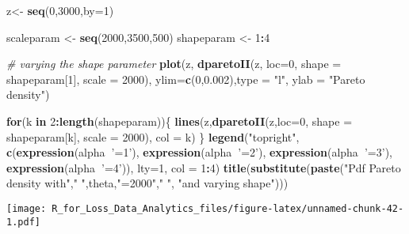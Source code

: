 \documentclass[]{book}
\newenvironment{Shaded}{\begin{snugshade}}{\end{snugshade}}
\newcommand{\KeywordTok}[1]{\textcolor[rgb]{0.13,0.29,0.53}{\textbf{#1}}}
\newcommand{\DataTypeTok}[1]{\textcolor[rgb]{0.13,0.29,0.53}{#1}}
\newcommand{\DecValTok}[1]{\textcolor[rgb]{0.00,0.00,0.81}{#1}}
\newcommand{\FloatTok}[1]{\textcolor[rgb]{0.00,0.00,0.81}{#1}}
\newcommand{\StringTok}[1]{\textcolor[rgb]{0.31,0.60,0.02}{#1}}
\newcommand{\CommentTok}[1]{\textcolor[rgb]{0.56,0.35,0.01}{\textit{#1}}}
\newcommand{\ControlFlowTok}[1]{\textcolor[rgb]{0.13,0.29,0.53}{\textbf{#1}}}
\newcommand{\OperatorTok}[1]{\textcolor[rgb]{0.81,0.36,0.00}{\textbf{#1}}}
\newcommand{\NormalTok}[1]{#1}
\theoremstyle{definition}
\theoremstyle{definition}
\theoremstyle{definition}
\theoremstyle{remark}
\begin{document}
\begin{Shaded}
\begin{Highlighting}[]
\NormalTok{z<-}\StringTok{ }\KeywordTok{seq}\NormalTok{(}\DecValTok{0}\NormalTok{,}\DecValTok{3000}\NormalTok{,}\DataTypeTok{by=}\DecValTok{1}\NormalTok{)}

\NormalTok{scaleparam <-}\StringTok{ }\KeywordTok{seq}\NormalTok{(}\DecValTok{2000}\NormalTok{,}\DecValTok{3500}\NormalTok{,}\DecValTok{500}\NormalTok{)}
\NormalTok{shapeparam <-}\StringTok{ }\DecValTok{1}\OperatorTok{:}\DecValTok{4}

\CommentTok{# varying the shape parameter}
\KeywordTok{plot}\NormalTok{(z, }\KeywordTok{dparetoII}\NormalTok{(z, }\DataTypeTok{loc=}\DecValTok{0}\NormalTok{, }\DataTypeTok{shape =}\NormalTok{ shapeparam[}\DecValTok{1}\NormalTok{], }\DataTypeTok{scale =} \DecValTok{2000}\NormalTok{), }\DataTypeTok{ylim=}\KeywordTok{c}\NormalTok{(}\DecValTok{0}\NormalTok{,}\FloatTok{0.002}\NormalTok{),}\DataTypeTok{type =} \StringTok{"l"}\NormalTok{, }\DataTypeTok{ylab =} \StringTok{"Pareto density"}\NormalTok{)}

\ControlFlowTok{for}\NormalTok{(k }\ControlFlowTok{in} \DecValTok{2}\OperatorTok{:}\KeywordTok{length}\NormalTok{(shapeparam))\{}
  \KeywordTok{lines}\NormalTok{(z,}\KeywordTok{dparetoII}\NormalTok{(z,}\DataTypeTok{loc=}\DecValTok{0}\NormalTok{, }\DataTypeTok{shape =}\NormalTok{ shapeparam[k], }\DataTypeTok{scale =} \DecValTok{2000}\NormalTok{), }\DataTypeTok{col =}\NormalTok{ k)}
\NormalTok{\}}
\KeywordTok{legend}\NormalTok{(}\StringTok{"topright"}\NormalTok{, }\KeywordTok{c}\NormalTok{(}\KeywordTok{expression}\NormalTok{(alpha}\OperatorTok{~}\StringTok{'=1'}\NormalTok{), }\KeywordTok{expression}\NormalTok{(alpha}\OperatorTok{~}\StringTok{'=2'}\NormalTok{), }\KeywordTok{expression}\NormalTok{(alpha}\OperatorTok{~}\StringTok{'=3'}\NormalTok{), }\KeywordTok{expression}\NormalTok{(alpha}\OperatorTok{~}\StringTok{'=4'}\NormalTok{)), }\DataTypeTok{lty=}\DecValTok{1}\NormalTok{, }\DataTypeTok{col =} \DecValTok{1}\OperatorTok{:}\DecValTok{4}\NormalTok{)}
\KeywordTok{title}\NormalTok{(}\KeywordTok{substitute}\NormalTok{(}\KeywordTok{paste}\NormalTok{(}\StringTok{"Pdf Pareto density with"}\NormalTok{,}\StringTok{" "}\NormalTok{,theta,}\StringTok{"=2000"}\NormalTok{,}\StringTok{" "}\NormalTok{, }\StringTok{"and varying shape"}\NormalTok{)))}
\end{Highlighting}
\end{Shaded}

\texttt{[image: R\_for\_Loss\_Data\_Analytics\_files/figure-latex/unnamed-chunk-42-1.pdf]}
\end{document}

